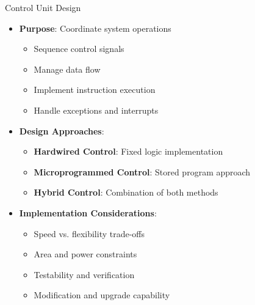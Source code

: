 \documentclass[aspectratio=169,11pt]{beamer}
\newcommand{\concept}[1]{\textbf{\color{accentcolor}#1}}
\begin{document}
\begin{frame}{Control Unit Design}
\begin{itemize}
\item \concept{Purpose}: Coordinate system operations
\begin{itemize}
\item Sequence control signals
\item Manage data flow
\item Implement instruction execution
\item Handle exceptions and interrupts
\end{itemize}
\vspace{0.5cm}
\item \concept{Design Approaches}:
\begin{itemize}
\item \textbf{Hardwired Control}: Fixed logic implementation
\item \textbf{Microprogrammed Control}: Stored program approach
\item \textbf{Hybrid Control}: Combination of both methods
\end{itemize}
\vspace{0.3cm}
\item \concept{Implementation Considerations}:
\begin{itemize}
\item Speed vs. flexibility trade-offs
\item Area and power constraints
\item Testability and verification
\item Modification and upgrade capability
\end{itemize}
\end{itemize}
\end{frame}
\end{document}
